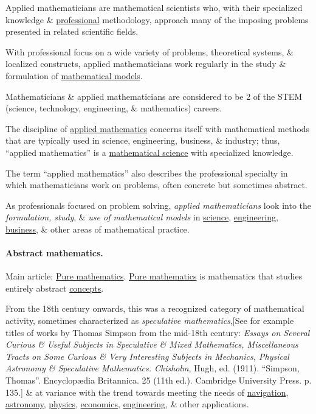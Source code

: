 \documentclass{article}
\begin{document}
Applied mathematicians are mathematical scientists who, with their specialized knowledge \& \href{https://en.wikipedia.org/wiki/Professional}{professional} methodology, approach many of the imposing problems presented in related scientific fields.

With professional focus on a wide variety of problems, theoretical systems, \& localized constructs, applied mathematicians work regularly in the study \& formulation of \href{https://en.wikipedia.org/wiki/Mathematical_models}{mathematical models}.

Mathematicians \& applied mathematicians are considered to be 2 of the STEM (science, technology, engineering, \& mathematics) careers.

%
The discipline of \href{https://en.wikipedia.org/wiki/Applied_mathematics}{applied mathematics} concerns itself with mathematical methods that are typically used in science, engineering, business, \& industry; thus, ``applied mathematics'' is a \href{https://en.wikipedia.org/wiki/Mathematical_science}{mathematical science} with specialized knowledge.

The term ``applied mathematics'' also describes the professional specialty in which mathematicians work on problems, often concrete but sometimes abstract.

As professionals focused on problem solving, \textit{applied mathematicians} look into the \textit{formulation, study}, \& \textit{use of mathematical models} in \href{https://en.wikipedia.org/wiki/Science}{science}, \href{https://en.wikipedia.org/wiki/Engineering}{engineering}, \href{https://en.wikipedia.org/wiki/Business}{business}, \& other areas of mathematical practice.

\paragraph{Abstract mathematics.} Main article: \href{https://en.wikipedia.org/wiki/Pure_mathematics}{Pure mathematics}. \href{https://en.wikipedia.org/wiki/Pure_mathematics}{Pure mathematics} is mathematics that studies entirely abstract \href{https://en.wikipedia.org/wiki/Concept}{concepts}.

From the 18th century onwards, this was a recognized category of mathematical activity, sometimes characterized as \textit{speculative mathematics},[See for example titles of works by Thomas Simpson from the mid-18th century: \textit{Essays on Several Curious \& Useful Subjects in Speculative \& Mixed Mathematics, Miscellaneous Tracts on Some Curious \& Very Interesting Subjects in Mechanics, Physical Astronomy \& Speculative Mathematics. Chisholm}, Hugh, ed. (1911). ``Simpson, Thomas''. Encyclop\ae dia Britannica. 25 (11th ed.). Cambridge University Press. p. 135.] \& at variance with the trend towards meeting the needs of \href{https://en.wikipedia.org/wiki/Navigation}{navigation}, \href{https://en.wikipedia.org/wiki/Astronomy}{astronomy}, \href{https://en.wikipedia.org/wiki/Physics}{physics}, \href{https://en.wikipedia.org/wiki/Economics}{economics}, \href{https://en.wikipedia.org/wiki/Engineering}{engineering}, \& other applications.
\end{document}
